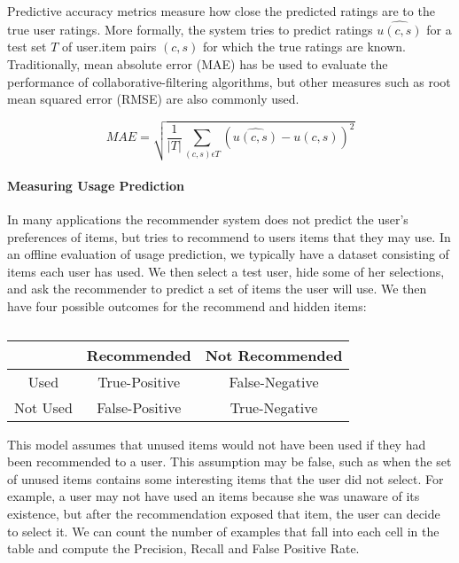Predictive accuracy metrics measure how close the predicted ratings are to the
true user ratings. More formally, the system tries to predict ratings
$\hat{u(c,s)}$ for a test set $T$ of user.item pairs $(c, s)$ for which the
true ratings are known. Traditionally, mean absolute error (MAE) has be used to
evaluate the performance of collaborative-filtering algorithms, but other
measures such as root mean squared error (RMSE) are also commonly used.

\begin{equation}
MAE = \sqrt{\frac{1}{\vert T \vert} \sum_{(c,s) \epsilon T}{(\hat{u(c,s)} - u(c,s))}^{2}}
\end{equation}

\paragraph{Measuring Usage Prediction}

In many applications the recommender system does not predict the user's
preferences of items, but tries to recommend to users items that they may use.
In an offline evaluation of usage prediction, we typically have a dataset
consisting of items each user has used. We then select a test user, hide some
of her selections, and ask the recommender to predict a set of items the user
will use. We then have four possible outcomes for the recommend and hidden
items:

\begin{center}
\begin{table}[H]
\begin{tabular}{|c|c|c|}
\hline
			&	Recommended		&	Not Recommended \\ \hline
Used		&	True-Positive 	&	False-Negative	\\ \hline
Not Used	&	False-Positive	&	True-Negative	\\ \hline
\end{tabular}
\label{table:usageprediction}
\caption{}
\end{table}
\end{center}

This model assumes that unused items would not have been used if they had been
recommended to a user. This assumption may be false, such as when the set of
unused items contains some interesting items that the user did not select. For
example, a user may not have used an items because she was unaware of its
existence, but after the recommendation exposed that item, the user can decide
to select it. We can count the number of examples that fall into each cell in
the table and compute the Precision, Recall and False Positive Rate.

